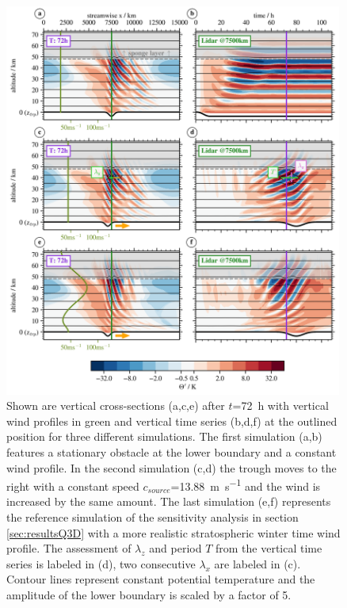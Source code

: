 \begin{figure}[tbp]
    \centering
    \includegraphics[width=0.99\textwidth]{figures_lidar/lidana_th.png}
    \caption{Shown are vertical cross-sections (a,c,e) after $t$=\SI{72}{\hour} with vertical wind profiles in green and vertical time series (b,d,f) at the outlined position for three different simulations. The first simulation (a,b) features a stationary obstacle at the lower boundary and a constant wind profile. In the second simulation (c,d) the trough moves to the right with a constant speed $c_{source}$=\SI{13.88}{\meter \per \second} and the wind is increased by the same amount. The last simulation (e,f) represents the reference simulation of the sensitivity analysis in section \ref{sec:resultsQ3D} with a more realistic stratospheric winter time wind profile. The assessment of $\lambda_z$ and period $T$ from the vertical time series is labeled in (d), two consecutive $\lambda_x$ are labeled in (c). Contour lines represent constant potential temperature and the amplitude of the lower boundary is scaled by a factor of 5.}
    \label{fig:lidar_sim}
\end{figure}

